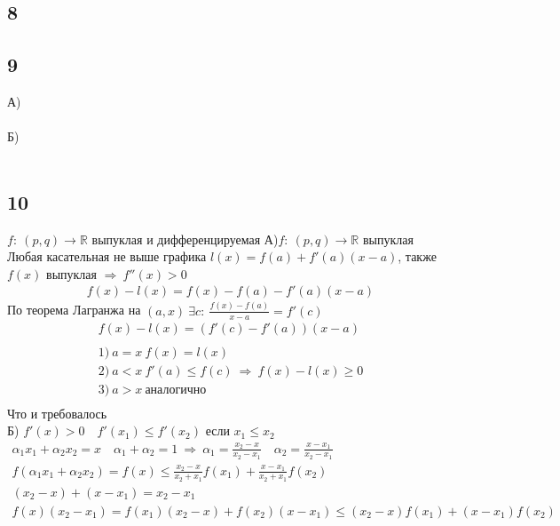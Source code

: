 		\subsection{8}
		
		\subsection{9}
		А)\\
		\\
		Б)\\
		\\
		
		\subsection{10}
		$f:\ (p,q) \to \mathbb{R}$ выпуклая и дифференцируемая
		А)$f:\ (p,q) \to \mathbb{R}$ выпуклая\\
		Любая касательная не выше графика 
		$l(x) = f(a) + f'(a)(x - a)$, также $f(x)$ выпуклая $\Rightarrow \ f''(x) > 0$
		\begin{gather*}
			f(x) - l(x) = f(x) - f(a) - f'(a)(x - a)
		\end{gather*}
		По теорема Лагранжа на $(a,x)\ \exists c:\ \frac{f(x) - f(a)}{x - a} = f'(c)$
		\begin{gather*}
			f(x) - l(x) = (f'(c) - f'(a))(x - a)\\
			\\
			1)\ a = x\ f(x) = l(x)\\
			2)\ a < x\ f'(a) \leqslant f(c) \ \Rightarrow \ f(x) - l(x) \geqslant 0\\
			3)\ a > x\ \text{аналогично}\\
		\end{gather*}
		Что и требовалось
		\\
		Б) $f'(x) > 0\quad f'(x_1) \leqslant f'(x_2)$ если $x_1 \leqslant x_2$\\
		\begin{gather*}
			\alpha_1 x_1 + \alpha_2 x_2 = x \quad \alpha_1 + \alpha_2 = 1 \ \Rightarrow \ \alpha_1 = \frac{x_2 - x}{x_2 - x_1} \quad \alpha_2 = \frac{x - x_1}{x_2 - x_1}\\
			f(\alpha_1 x_1 + \alpha_2 x_2) = f(x) \leqslant \frac{x_2 - x}{x_2 + x_1} f(x_1) + \frac{x - x_1}{x_2 + x_1} f(x_2)\\
			(x_2 - x) + (x - x_1) = x_2 - x_1\\
			f(x)(x_2 - x_1) = f(x_1) (x_2 - x) + f(x_2)(x - x_1) \leqslant (x_2 - x) f(x_1) + (x - x_1) f(x_2)\\
		\end{gather*}
